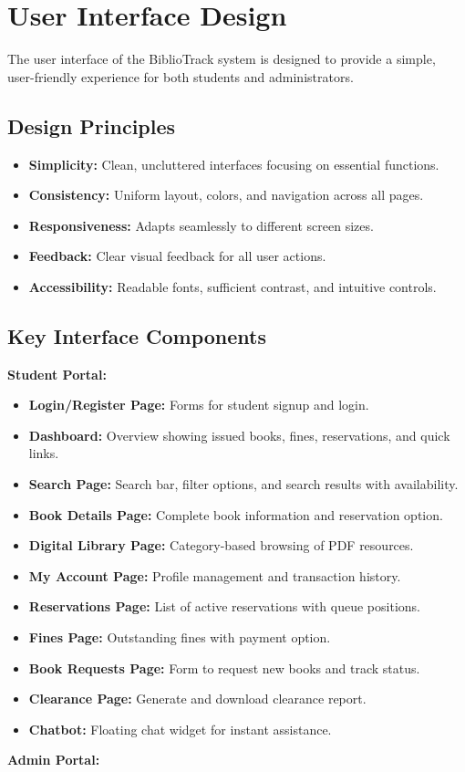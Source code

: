 \documentclass[12pt,a4paper]{report}
\begin{document}
\section{User Interface Design}
\label{sec:uidesign}

The user interface of the BiblioTrack system is designed to provide a simple, user-friendly experience for both students and administrators.

\subsection{Design Principles}

\begin{itemize}
    \item \textbf{Simplicity:} Clean, uncluttered interfaces focusing on essential functions.
    \item \textbf{Consistency:} Uniform layout, colors, and navigation across all pages.
    \item \textbf{Responsiveness:} Adapts seamlessly to different screen sizes.
    \item \textbf{Feedback:} Clear visual feedback for all user actions.
    \item \textbf{Accessibility:} Readable fonts, sufficient contrast, and intuitive controls.
\end{itemize}

\subsection{Key Interface Components}

\textbf{Student Portal:}

\begin{itemize}
    \item \textbf{Login/Register Page:} Forms for student signup and login.
    \item \textbf{Dashboard:} Overview showing issued books, fines, reservations, and quick links.
    \item \textbf{Search Page:} Search bar, filter options, and search results with availability.
    \item \textbf{Book Details Page:} Complete book information and reservation option.
    \item \textbf{Digital Library Page:} Category-based browsing of PDF resources.
    \item \textbf{My Account Page:} Profile management and transaction history.
    \item \textbf{Reservations Page:} List of active reservations with queue positions.
    \item \textbf{Fines Page:} Outstanding fines with payment option.
    \item \textbf{Book Requests Page:} Form to request new books and track status.
    \item \textbf{Clearance Page:} Generate and download clearance report.
    \item \textbf{Chatbot:} Floating chat widget for instant assistance.
\end{itemize}
\textbf{Admin Portal:}
\end{document}
